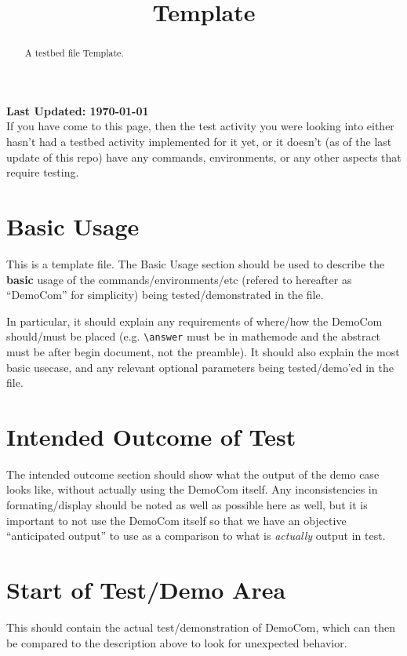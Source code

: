 \documentclass{ximera}
\title{Template}
\begin{document}
\begin{abstract}
    A testbed file Template.
\end{abstract}
\maketitle

{{\Huge \bfseries Last Updated: \today}} \\

If you have come to this page, then the test activity you were looking into either hasn't had a testbed activity implemented for it yet, 
or it doesn't (as of the last update of this repo) have any commands, environments, or any other aspects that require testing.

\section{Basic Usage}

This is a template file. The Basic Usage section should be used to describe the \textbf{basic} usage 
of the commands/environments/etc (refered to hereafter as ``DemoCom'' for simplicity) being tested/demonstrated in the file. 

In particular, it should explain any requirements of where/how the DemoCom should/must be placed (e.g. \verb|\answer| must be in mathemode 
and the abstract must be after begin document, not the preamble). It should also explain the most basic usecase, and any 
relevant optional parameters being tested/demo'ed in the file.

\section{Intended Outcome of Test}

The intended outcome section should show what the output of the demo case looks like, without actually using the DemoCom itself.
Any inconsistencies in formating/display should be noted as well as possible here as well, but it is important to not use the 
DemoCom itself so that we have an objective ``anticipated output'' to use as a comparison to what is \textit{actually} output in
test. 

\section{Start of Test/Demo Area}

This should contain the actual test/demonstration of DemoCom, which can then be compared to the description above to look for 
unexpected behavior.

\hrulefill
\end{document}
